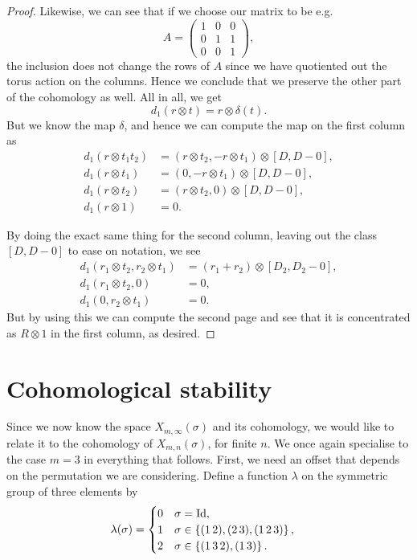 \begin{proof}
  Likewise, we can see that if we choose our matrix to be e.g.
  \[ A = \begin{pmatrix}
    1 & 0 & 0 \\
    0 & 1 & 1 \\
    0 & 0 & 1
  \end{pmatrix}, \]
  the inclusion does not change the rows of $A$ since we have
  quotiented out the torus action on the columns. Hence we conclude
  that we preserve the other part of the cohomology as well. All in
  all, we get
  \[ d_1(r\otimes t) = r \otimes \delta(t). \]
  But we know the map $\delta$, and hence we can compute the map on
  the first
  column as
  \begin{align*}
    d_1(r \otimes t_1t_2) &= ( r\otimes t_2, - r\otimes t_1) \otimes
    [D,D-0], \\
    d_1(r \otimes t_1) &= (0, -r\otimes t_1) \otimes [D,D-0], \\
    d_1(r \otimes t_2) &= (r\otimes t_2,0) \otimes [D,D-0], \\
    d_1(r \otimes 1) &= 0.
  \end{align*}

  By doing the exact same thing for the second column, leaving out
  the class $[D,D-0]$ to ease on notation, we see
  \begin{align*}
    d_1( r_1\otimes t_2, r_2\otimes t_1) &= (r_1 + r_2) \otimes
                                           [D_2,D_2-0], \\
    d_1( r_1 \otimes t_2, 0) &= 0, \\
    d_1( 0, r_2\otimes t_1) &= 0.
  \end{align*} 
  But by using this we can compute the second page and see that it is
  concentrated as $R\otimes 1$ in the first column, as desired.
\end{proof}


\section{Cohomological stability}
\label{sec:costa}

Since we now know the space $X_{m,\infty}(\sigma)$ and its cohomology, we
would like to relate it to the cohomology of
$X_{m,n}(\sigma)$, for finite $n$. We once again specialise to the
case $m = 3$ in
everything that
follows. First, we need an offset that depends on the permutation
we are considering.
Define a function $\lambda$ on the symmetric group of three elements
by
\begin{align*}
  \lambda(\sigma) &=
                    \begin{cases}
                      0 & \sigma = \operatorname{Id}, \\
                      1 & \sigma \in \left\{ (1\,2),(2\,3),(1\,2\,3) \right\},
                      \\
                      2 & \sigma \in \left\{ (1\,3\,2), (1\,3) \right\}.
                    \end{cases}
\end{align*}

